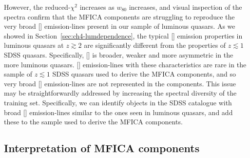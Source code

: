 However, the reduced-$\chi^2$ increases as $w_{80}$ increases, and visual inspection of the spectra confirm that the MFICA components are struggling to reproduce the very broad [] emission-lines present in our sample of luminous quasars. 
As we showed in Section~\ref{sec:ch4-lumdependence}, the typical [] emission properties in luminous quasars at $z \gtrsim 2$ are significantly different from the properties of $z \lesssim 1$ SDSS quasars. 
Specifically, [] is broader, weaker and more asymmetric in the more luminous quasars.  
[] emission-lines with these characteristics are rare in the sample of $z \lesssim 1$ SDSS quasars used to derive the MFICA components, and so very broad [] emission-lines are not represented in the components. 
This issue may be straightforwardly addressed by increasing the spectral diversity of the training set. 
Specifically, we can identify objects in the SDSS catalogue with broad [] emission-lines similar to the ones seen in luminous quasars, and add these to the sample used to derive the MFICA components. 

\subsection{Interpretation of MFICA components}

